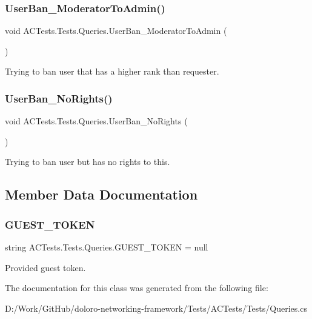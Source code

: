 \subsubsection{\texorpdfstring{User\+Ban\+\_\+\+Moderator\+To\+Admin()}{UserBan\_ModeratorToAdmin()}}
{\footnotesize\ttfamily void A\+C\+Tests.\+Tests.\+Queries.\+User\+Ban\+\_\+\+Moderator\+To\+Admin (\begin{DoxyParamCaption}{ }\end{DoxyParamCaption})}



Trying to ban user that has a higher rank than requester. 

\mbox{\label{class_a_c_tests_1_1_tests_1_1_queries_a13c440cfccaf9a8494769e03131fdddd}} 
\subsubsection{\texorpdfstring{User\+Ban\+\_\+\+No\+Rights()}{UserBan\_NoRights()}}
{\footnotesize\ttfamily void A\+C\+Tests.\+Tests.\+Queries.\+User\+Ban\+\_\+\+No\+Rights (\begin{DoxyParamCaption}{ }\end{DoxyParamCaption})}



Trying to ban user but has no rights to this. 



\subsection{Member Data Documentation}
\mbox{\label{class_a_c_tests_1_1_tests_1_1_queries_a380e8f923ee219755af841d4e9008a02}} 
\subsubsection{\texorpdfstring{G\+U\+E\+S\+T\+\_\+\+T\+O\+K\+EN}{GUEST\_TOKEN}}
{\footnotesize\ttfamily string A\+C\+Tests.\+Tests.\+Queries.\+G\+U\+E\+S\+T\+\_\+\+T\+O\+K\+EN = null\hspace{0.3cm}{\ttfamily [static]}}



Provided guest token. 



The documentation for this class was generated from the following file\+:\begin{DoxyCompactItemize}
\item 
D\+:/\+Work/\+Git\+Hub/doloro-\/networking-\/framework/\+Tests/\+A\+C\+Tests/\+Tests/Queries.\+cs\end{DoxyCompactItemize}
